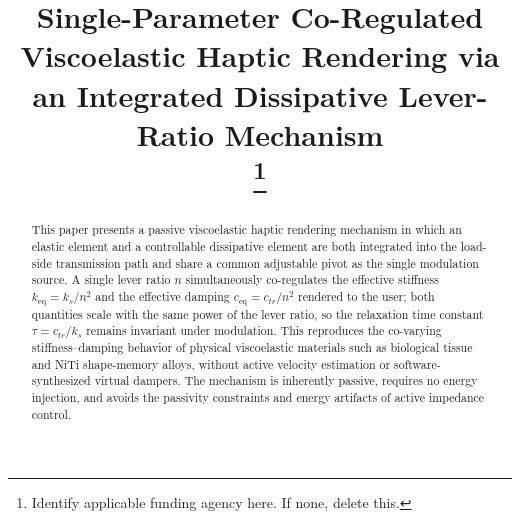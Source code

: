 ﻿\documentclass[conference]{IEEEtran}
\begin{document}
\title{Single-Parameter Co-Regulated Viscoelastic Haptic Rendering via an Integrated Dissipative Lever-Ratio Mechanism\\
\thanks{Identify applicable funding agency here. If none, delete this.}
}

\author{
\and
{}
\and
{}
}

\maketitle

\begin{abstract}
This paper presents a passive viscoelastic haptic rendering mechanism in which
an elastic element and a controllable dissipative element are both integrated
into the load-side transmission path and share a common adjustable pivot as the
single modulation source. A single lever ratio $n$ simultaneously co-regulates
the effective stiffness $k_{\mathrm{eq}}=k_s/n^{2}$ and the effective
damping $c_{\mathrm{eq}}=c_{tr}/n^{2}$ rendered to the user;
both quantities scale with the same power of the lever ratio, so the
relaxation time constant $\tau=c_{tr}/k_s$ remains invariant under
modulation. This reproduces the co-varying
stiffness--damping behavior of physical viscoelastic materials such as
biological tissue and NiTi shape-memory alloys, without active velocity
estimation or software-synthesized virtual dampers. The mechanism is
inherently passive, requires no energy injection, and avoids the passivity
constraints and energy artifacts of active impedance control.
\end{abstract}
\end{document}
